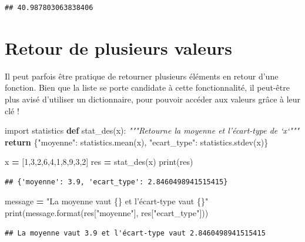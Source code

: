 \documentclass[12pt,]{book}
\newenvironment{Shaded}{\begin{snugshade}}{\end{snugshade}}
\newcommand{\KeywordTok}[1]{\textcolor[rgb]{0.13,0.29,0.53}{\textbf{#1}}}
\newcommand{\DecValTok}[1]{\textcolor[rgb]{0.00,0.00,0.81}{#1}}
\newcommand{\SpecialCharTok}[1]{\textcolor[rgb]{0.00,0.00,0.00}{#1}}
\newcommand{\StringTok}[1]{\textcolor[rgb]{0.31,0.60,0.02}{#1}}
\newcommand{\ImportTok}[1]{#1}
\newcommand{\CommentTok}[1]{\textcolor[rgb]{0.56,0.35,0.01}{\textit{#1}}}
\newcommand{\ControlFlowTok}[1]{\textcolor[rgb]{0.13,0.29,0.53}{\textbf{#1}}}
\newcommand{\OperatorTok}[1]{\textcolor[rgb]{0.81,0.36,0.00}{\textbf{#1}}}
\newcommand{\BuiltInTok}[1]{#1}
\newcommand{\NormalTok}[1]{#1}
\numberwithin{equation}{section}
\numberwithin{countremarque}{section}
\begin{document}
\begin{lstlisting}
## 40.987803063838406
\end{lstlisting}

\section{Retour de plusieurs valeurs}\label{retour-de-plusieurs-valeurs}

Il peut parfois être pratique de retourner plusieurs éléments en retour
d'une fonction. Bien que la liste se porte candidate à cette
fonctionnalité, il peut-être plus avisé d'utiliser un dictionnaire, pour
pouvoir accéder aux valeurs grâce à leur clé !

\begin{Shaded}
\begin{Highlighting}[]
\ImportTok{import}\NormalTok{ statistics}
\KeywordTok{def}\NormalTok{ stat_des(x):}
  \CommentTok{"""Retourne la moyenne et l'écart-type de `x`"""}
  \ControlFlowTok{return}\NormalTok{ \{}\StringTok{"moyenne"}\NormalTok{: statistics.mean(x),}
  \StringTok{"ecart_type"}\NormalTok{: statistics.stdev(x)\}}

\NormalTok{x }\OperatorTok{=}\NormalTok{ [}\DecValTok{1}\NormalTok{,}\DecValTok{3}\NormalTok{,}\DecValTok{2}\NormalTok{,}\DecValTok{6}\NormalTok{,}\DecValTok{4}\NormalTok{,}\DecValTok{1}\NormalTok{,}\DecValTok{8}\NormalTok{,}\DecValTok{9}\NormalTok{,}\DecValTok{3}\NormalTok{,}\DecValTok{2}\NormalTok{]}
\NormalTok{res }\OperatorTok{=}\NormalTok{ stat_des(x)}
\BuiltInTok{print}\NormalTok{(res)}
\end{Highlighting}
\end{Shaded}

\begin{lstlisting}
## {'moyenne': 3.9, 'ecart_type': 2.8460498941515415}
\end{lstlisting}

\begin{Shaded}
\begin{Highlighting}[]
\NormalTok{message }\OperatorTok{=} \StringTok{"La moyenne vaut }\SpecialCharTok{\{\}}\StringTok{ et l'écart-type vaut }\SpecialCharTok{\{\}}\StringTok{"}
\BuiltInTok{print}\NormalTok{(message.}\BuiltInTok{format}\NormalTok{(res[}\StringTok{"moyenne"}\NormalTok{], res[}\StringTok{"ecart_type"}\NormalTok{]))}
\end{Highlighting}
\end{Shaded}

\begin{lstlisting}
## La moyenne vaut 3.9 et l'écart-type vaut 2.8460498941515415
\end{lstlisting}
\end{document}
